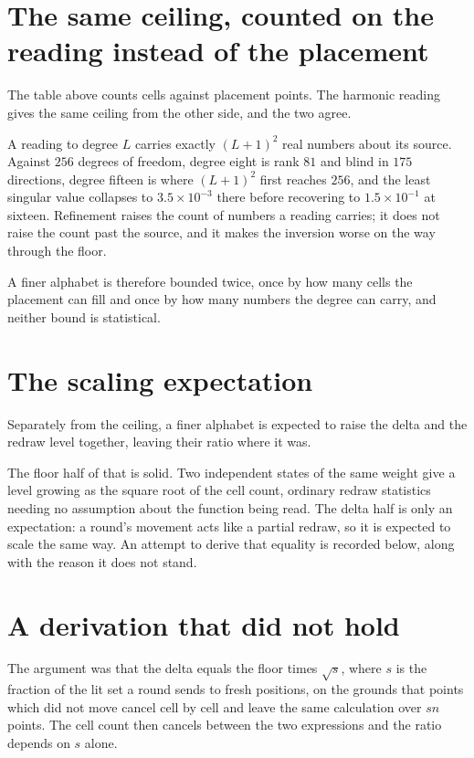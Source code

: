 \section{The same ceiling, counted on the reading instead of the placement}

The table above counts cells against placement points. The harmonic reading gives the same ceiling from the other side, and the two agree.

A reading to degree \(L\) carries exactly \((L+1)^2\) real numbers about its source. Against \(256\) degrees of freedom, degree eight is rank \(81\) and blind in \(175\) directions, degree fifteen is where \((L+1)^2\) first reaches \(256\), and the least singular value collapses to \(3.5 \times 10^{-3}\) there before recovering to \(1.5 \times 10^{-1}\) at sixteen. Refinement raises the count of numbers a reading carries; it does not raise the count past the source, and it makes the inversion worse on the way through the floor.

A finer alphabet is therefore bounded twice, once by how many cells the placement can fill and once by how many numbers the degree can carry, and neither bound is statistical.

\section{The scaling expectation}

Separately from the ceiling, a finer alphabet is expected to raise the delta and the redraw level together, leaving their ratio where it was.

The floor half of that is solid. Two independent states of the same weight give a level growing as the square root of the cell count, ordinary redraw statistics needing no assumption about the function being read. The delta half is only an expectation: a round's movement acts like a partial redraw, so it is expected to scale the same way. An attempt to derive that equality is recorded below, along with the reason it does not stand.

\section{A derivation that did not hold}

The argument was that the delta equals the floor times \(\sqrt{s}\), where \(s\) is the fraction of the lit set a round sends to fresh positions, on the grounds that points which did not move cancel cell by cell and leave the same calculation over \(s n\) points. The cell count then cancels between the two expressions and the ratio depends on \(s\) alone.

